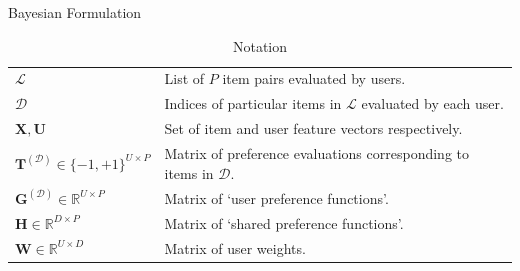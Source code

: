 \documentclass[final]{beamer}
\newlength{\onecolwid}
\begin{document}
\begin{frame}[t]
\begin{columns}[t]
\begin{column}{\onecolwid}
\begin{block}{Bayesian Formulation}
       \begin{table}
       \caption{Notation}
       \begin{tabular}{l|l}
       $\mathcal{L}$ & List of $P$ item pairs evaluated by users. \\
       $\mathcal{D}$ & Indices of particular items in $\mathcal{L}$ evaluated by each
         user. \\
       $\mathbf{X}, \mathbf{U}$  & Set of item and user feature vectors respectively. \\
       $\mathbf{T}^{(\mathcal{D})}\in \{-1,+1\}^{U\times P}$ &
         Matrix of preference evaluations corresponding to items in $\mathcal{D}$. \\
       $\mathbf{G}^{(\mathcal{D})}\in \mathbb{R}^{U\times P}$ &
         Matrix of `user preference functions'. \\
       $\mathbf{H}\in \mathbb{R}^{D\times P}$ & Matrix of `shared preference functions'. \\
       $\mathbf{W}\in \mathbb{R}^{U\times D}$ & Matrix of user weights.
       \end{tabular}
       \end{table}
    \end{block}


\end{column}
\end{columns}
\end{frame}
\end{document}
